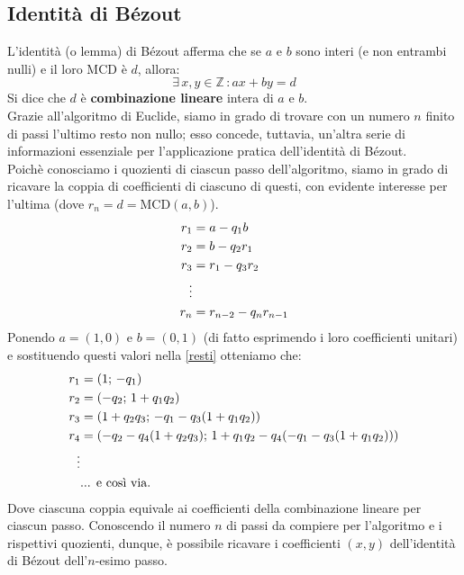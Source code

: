 \subsection{Identità di B\'ezout}
L'identità (o lemma) di Bézout afferma che se $a$ e $b$ sono interi (e non entrambi nulli) e il loro MCD è $d$, allora:
\begin{equation}\label{Bezout}
\exists \, x,y \in \mathbb{Z} \, : ax+by=d
\end{equation}
Si dice che $d$ è \textbf{combinazione lineare} intera di $a$ e $b$.\\
Grazie all'algoritmo di Euclide, siamo in grado di trovare con un numero $n$ finito di passi l'ultimo resto non nullo; esso concede, tuttavia, un'altra serie di informazioni essenziale per l'applicazione pratica dell'identità di B\'ezout.\\
Poichè conosciamo i quozienti di ciascun passo dell'algoritmo, siamo in grado di ricavare la coppia di coefficienti di ciascuno di questi, con evidente interesse per l'ultima (dove $r_n=d=\text{MCD}(a,b)$).
\begin{equation} \label{resti}
\begin{split}
r_1 & = a - q_1 b \\
r_2 & = b - q_2 r_1 \\
r_3 & = r_1 - q_3 r_2 \\
\hspace{-4em}\vdots \\
r_n & = r_{n-2} - q_n r_{n-1}
\end{split}
\end{equation}
Ponendo $a=(1,0)$ e $b=(0,1)$ (di fatto esprimendo i loro coefficienti unitari) e sostituendo questi valori nella \eqref{resti} otteniamo che:
\begin{equation} \label{coefficienti}
\begin{split}
r_1 & = (1;\, -q_1) \\
r_2 & = (-q_2;\, 1+q_1 q_2) \\
r_3 & = (1+q_2 q_3;\, -q_1 -q_3(1+q_1 q_2)) \\
r_4 & = (-q_2 -q_4(1+q_2 q_3);\, 1+q_1 q_2 -q_4(-q_1 -q_3(1+q_1 q_2))) \\
\hspace{-4em}\vdots \\
& \text{... e così via.}
\end{split}
\end{equation}
Dove ciascuna coppia equivale ai coefficienti della combinazione lineare per ciascun passo. Conoscendo il numero $n$ di passi da compiere per l'algoritmo e i rispettivi quozienti, dunque, è possibile ricavare i coefficienti $(x,y)$ dell'identità di B\'ezout dell'$n$-esimo passo.